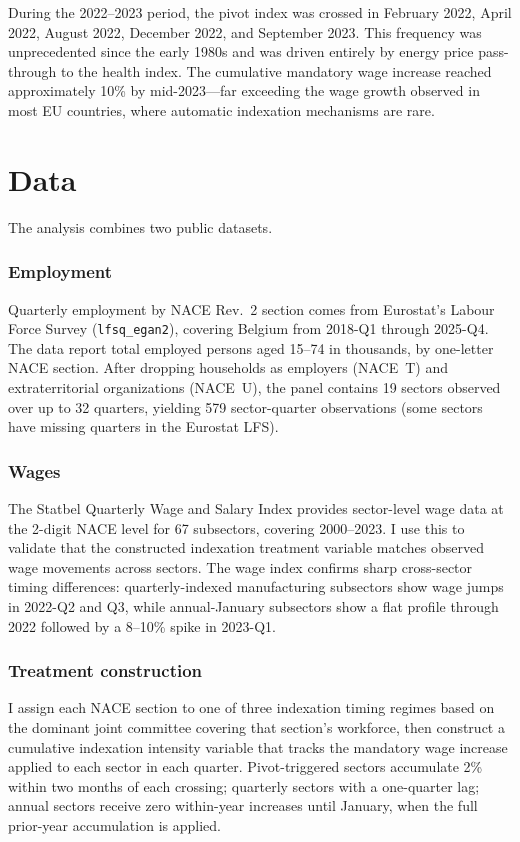 \documentclass[12pt]{article}
\begin{document}
During the 2022--2023 period, the pivot index was crossed in February 2022, April 2022, August 2022, December 2022, and September 2023. This frequency was unprecedented since the early 1980s and was driven entirely by energy price pass-through to the health index. The cumulative mandatory wage increase reached approximately 10\% by mid-2023---far exceeding the wage growth observed in most EU countries, where automatic indexation mechanisms are rare.


\section{Data}

The analysis combines two public datasets.

\subsubsection*{Employment} Quarterly employment by NACE Rev.~2 section comes from Eurostat's Labour Force Survey (\texttt{lfsq\_egan2}), covering Belgium from 2018-Q1 through 2025-Q4. The data report total employed persons aged 15--74 in thousands, by one-letter NACE section. After dropping households as employers (NACE~T) and extraterritorial organizations (NACE~U), the panel contains 19 sectors observed over up to 32 quarters, yielding 579 sector-quarter observations (some sectors have missing quarters in the Eurostat LFS).

\subsubsection*{Wages} The Statbel Quarterly Wage and Salary Index provides sector-level wage data at the 2-digit NACE level for 67 subsectors, covering 2000--2023. I use this to validate that the constructed indexation treatment variable matches observed wage movements across sectors. The wage index confirms sharp cross-sector timing differences: quarterly-indexed manufacturing subsectors show wage jumps in 2022-Q2 and Q3, while annual-January subsectors show a flat profile through 2022 followed by a 8--10\% spike in 2023-Q1.

\subsubsection*{Treatment construction} I assign each NACE section to one of three indexation timing regimes based on the dominant joint committee covering that section's workforce, then construct a cumulative indexation intensity variable that tracks the mandatory wage increase applied to each sector in each quarter. Pivot-triggered sectors accumulate 2\% within two months of each crossing; quarterly sectors with a one-quarter lag; annual sectors receive zero within-year increases until January, when the full prior-year accumulation is applied.
\end{document}
